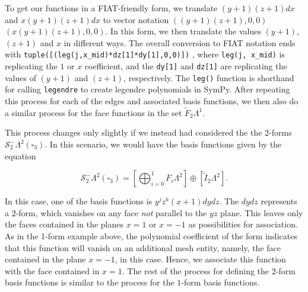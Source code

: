 \documentclass[format=acmsmall,screen,timestamp=false,a4paper]{acmart}
\newcommand\lm[1]{\textbf{\textcolor[rgb]{1,0,0.5}{[Lawrence: #1]}}}
\newcommand{\calS}{\mathcal{S}}
\begin{document}
To get our functions in a FIAT-friendly form, we translate $(y+1)(z+1)dx$ and $x(y+1)(z+1)dx$ to vector notation $((y+1)(z+1), 0, 0)$ $(x(y+1)(z+1),0,0)$.  In this form, we then translate the values $(y+1)$, $(z+1)$ and $x$ in different ways.  The overall conversion to FIAT notation ends with 
\texttt{tuple([(leg(j,x\_mid)*dz[1]*dy[1],0,0)])}
, where \texttt{leg(j, x\_mid)} is replicating the $1$ or $x$ coefficient, and the \texttt{dy[1]} and \texttt{dz[1]} are replicating the values of $(y+1)$ and $(z+1)$, respectively.  The \texttt{leg()} function is shorthand for calling \texttt{legendre} to create legendre polynomials in SymPy.  After repeating this process for each of the edges and associated basis functions, we then also do a similar process for the face functions in the set $\tilde{F}_2 \Lambda^1$.  

This process changes only slightly if we instead had considered the the $2$-forms $\mathcal{S}^-_2 \Lambda^2(\square_3)$.  In this scenario, we would have the basis functions given by the equation

\begin{equation*}
\calS^-_2\Lambda^2(\square_3) =    \left[\bigoplus_{i=0}^{1} F_i \Lambda^2\right] \oplus \left[\tilde{I}_2 \Lambda^2\right].
\end{equation*}

\noindent In this case, one of the basis functions is $y^jz^k(x+1)dydz$.  The $dydz$ represents a $2$-form, which vanishes on any face \textit{not} parallel to the $yz$ plane.  This leaves only the faces contained in the planes $x=1$ or $x=-1$ as possibilities for association. 
As in the 1-form example above, the polynomial coefficient of the form indicates that this function will vanish on an additional mesh entity, namely, the face contained in the plane $x=-1$, in this case.
Hence, we associate this function with the face contained in $x=1$.  The rest of the process for defining the $2$-form basis functions is similar to the process for the $1$-form basis functions.
\end{document}
